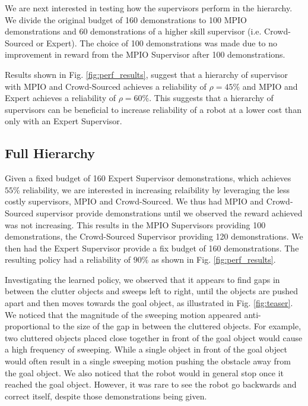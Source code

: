\documentclass[10pt, conference]{ieeeconf}      %
\begin{document}
We are next interested in testing how the supervisors perform in the hierarchy. We divide the original budget of 160 demonstrations to 100 MPIO demonstrations and 60 demonstrations of a higher skill supervisor (i.e. Crowd-Sourced or Expert). The choice of 100 demonstrations was made due to no improvement in reward from the MPIO Supervisor after 100 demonstrations. 

Results shown in Fig. \ref{fig:perf_results}, suggest that a hierarchy of supervisor with MPIO and Crowd-Sourced achieves a reliability of $\rho = 45\%$ and MPIO and Expert achieves a reliability of $\rho = 60\%$. This suggests that a hierarchy of supervisors can be beneficial to increase reliability of a robot at a lower cost than only with an Expert Supervisor. 




\subsection{Full Hierarchy}
Given a fixed budget of 160 Expert Supervisor demonstrations, which achieves $55\%$ reliability,  we are interested in increasing relaibility by leveraging the less costly supervisors, MPIO and Crowd-Sourced.  We thus had MPIO and Crowd-Sourced supervisor provide demonstrations until we observed the reward achieved was not increasing. This results in the
MPIO Supervisors providing 100 demonstrations, the Crowd-Sourced Supervisor providing 120 demonstrations. We then had the Expert Supervisor provide a fix budget of 160 demonstrations. The resulting policy had a reliability of $90\%$ as shown in Fig. \ref{fig:perf_results}.

Investigating the learned policy, we observed that it appears to find gaps in between the clutter objects and sweeps
left to right,  until the objects are pushed apart and then moves towards the goal object, as illustrated in Fig.
\ref{fig:teaser}. We noticed that the magnitude of the sweeping motion appeared anti-proportional to the size of the gap in
 between the cluttered objects. For example, two cluttered objects placed close together in front of the goal object would  cause a high frequency of sweeping. While a single object in front of the goal object would often result in a single sweeping motion pushing the obstacle away from the goal object.  We also noticed that the robot would in general stop once it reached the goal object. However, it was rare to see the robot go backwards and correct itself, despite those demonstrations being given. 
\end{document}
